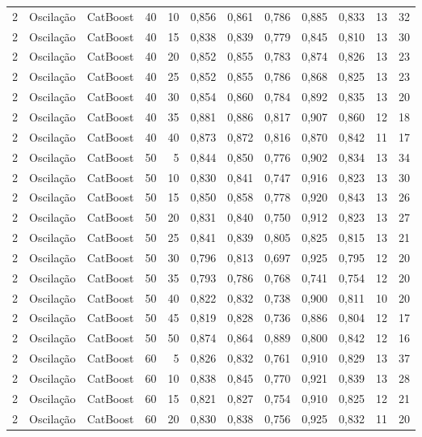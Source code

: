 \begin{longtable}{@{}rllrrrrrrrrr@{}}
2 & Oscilação & CatBoost & 40 & 10 & 0,856 & 0,861 & 0,786 & 0,885 & 0,833 & 13 & 32 \\
2 & Oscilação & CatBoost & 40 & 15 & 0,838 & 0,839 & 0,779 & 0,845 & 0,810 & 13 & 30 \\
2 & Oscilação & CatBoost & 40 & 20 & 0,852 & 0,855 & 0,783 & 0,874 & 0,826 & 13 & 23 \\
2 & Oscilação & CatBoost & 40 & 25 & 0,852 & 0,855 & 0,786 & 0,868 & 0,825 & 13 & 23 \\
2 & Oscilação & CatBoost & 40 & 30 & 0,854 & 0,860 & 0,784 & 0,892 & 0,835 & 13 & 20 \\
2 & Oscilação & CatBoost & 40 & 35 & 0,881 & 0,886 & 0,817 & 0,907 & 0,860 & 12 & 18 \\
2 & Oscilação & CatBoost & 40 & 40 & 0,873 & 0,872 & 0,816 & 0,870 & 0,842 & 11 & 17 \\
2 & Oscilação & CatBoost & 50 & 5 & 0,844 & 0,850 & 0,776 & 0,902 & 0,834 & 13 & 34 \\
2 & Oscilação & CatBoost & 50 & 10 & 0,830 & 0,841 & 0,747 & 0,916 & 0,823 & 13 & 30 \\
2 & Oscilação & CatBoost & 50 & 15 & 0,850 & 0,858 & 0,778 & 0,920 & 0,843 & 13 & 26 \\
2 & Oscilação & CatBoost & 50 & 20 & 0,831 & 0,840 & 0,750 & 0,912 & 0,823 & 13 & 27 \\
2 & Oscilação & CatBoost & 50 & 25 & 0,841 & 0,839 & 0,805 & 0,825 & 0,815 & 13 & 21 \\
2 & Oscilação & CatBoost & 50 & 30 & 0,796 & 0,813 & 0,697 & 0,925 & 0,795 & 12 & 20 \\
2 & Oscilação & CatBoost & 50 & 35 & 0,793 & 0,786 & 0,768 & 0,741 & 0,754 & 12 & 20 \\
2 & Oscilação & CatBoost & 50 & 40 & 0,822 & 0,832 & 0,738 & 0,900 & 0,811 & 10 & 20 \\
2 & Oscilação & CatBoost & 50 & 45 & 0,819 & 0,828 & 0,736 & 0,886 & 0,804 & 12 & 17 \\
2 & Oscilação & CatBoost & 50 & 50 & 0,874 & 0,864 & 0,889 & 0,800 & 0,842 & 12 & 16 \\
2 & Oscilação & CatBoost & 60 & 5 & 0,826 & 0,832 & 0,761 & 0,910 & 0,829 & 13 & 37 \\
2 & Oscilação & CatBoost & 60 & 10 & 0,838 & 0,845 & 0,770 & 0,921 & 0,839 & 13 & 28 \\
2 & Oscilação & CatBoost & 60 & 15 & 0,821 & 0,827 & 0,754 & 0,910 & 0,825 & 12 & 21 \\
2 & Oscilação & CatBoost & 60 & 20 & 0,830 & 0,838 & 0,756 & 0,925 & 0,832 & 11 & 20 \\

\end{longtable}
